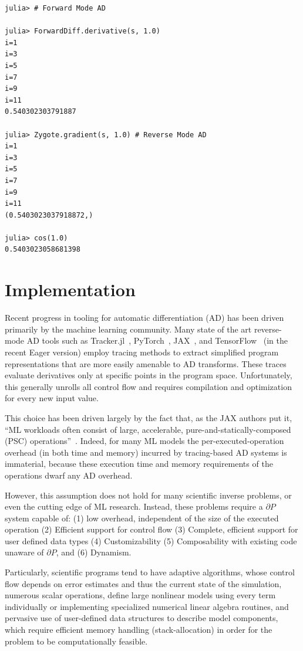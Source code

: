 \documentclass{juliacon}
\begin{document}
\begin{verbatim}
julia> # Forward Mode AD

julia> ForwardDiff.derivative(s, 1.0)
i=1
i=3
i=5
i=7
i=9
i=11
0.540302303791887

julia> Zygote.gradient(s, 1.0) # Reverse Mode AD
i=1
i=3
i=5
i=7
i=9
i=11
(0.5403023037918872,)

julia> cos(1.0)
0.5403023058681398 
\end{verbatim}

    
\section{Implementation}
\label{Impl}

    Recent progress in tooling for automatic differentiation (AD) has been driven primarily by the machine learning community. Many state of the art reverse-mode AD tools such as Tracker.jl~\cite{Flux.jl-2018,2019sbc}, PyTorch~\cite{pytorch}, JAX~\cite{jax}, and TensorFlow~\cite{tensorflow} (in the recent Eager version) employ tracing methods to extract simplified program representations that are more easily amenable to AD transforms. These traces evaluate derivatives only at specific points in the program space. Unfortunately, this generally unrolls all control flow and requires compilation and optimization for every new input value.
    
    This choice has been driven largely by the fact that, as the JAX authors put it, ``ML workloads often consist of large, accelerable, pure-and-statically-composed (PSC) operations''~\cite{jax}. Indeed, for many ML models the per-executed-operation overhead (in both time and memory) incurred by tracing-based AD systems is immaterial, because these execution time and memory requirements of the operations dwarf any AD overhead.
    
    However, this assumption does not hold for many scientific inverse problems, or even the cutting edge of ML research. Instead, these problems require a $\partial P$ system capable of: (1) low overhead, independent of the size of the executed operation (2) Efficient support for control flow (3) Complete, efficient support for user defined data types (4) Customizability (5) Composability with existing code unaware of $\partial P$, and (6) Dynamism.

    Particularly, scientific programs tend to have adaptive algorithms, whose control flow depends on error estimates and thus the current state of the simulation, numerous scalar operations, define large nonlinear models using every term individually or implementing specialized numerical linear algebra routines, and pervasive use of user-defined data structures to describe model components, which require efficient memory handling (stack-allocation) in order for the problem to be computationally feasible. 
\end{document}
